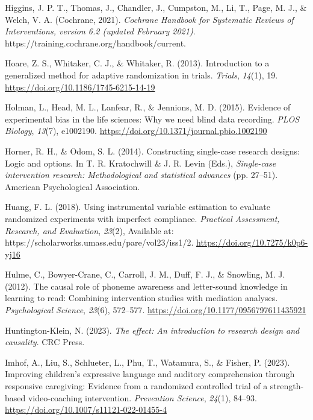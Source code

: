 \documentclass{krantz}
\newlength{\cslhangindent}
\newlength{\cslentryspacingunit} %
\newenvironment{CSLReferences}[2] %
{%
\setlength{\parindent}{0pt}
\ifodd #1
\let\oldpar\par
\def\par{\hangindent=\cslhangindent\oldpar}
\fi
\setlength{\parskip}{#2\cslentryspacingunit}
}%
{}
\begin{document}
\begin{CSLReferences}{1}{0}
\leavevmode{}%
Higgins, J. P. T., Thomas, J., Chandler, J., Cumpston, M., Li, T., Page, M. J., \& Welch, V. A. (Cochrane, 2021). \emph{Cochrane {Handbook} for {Systematic Reviews} of {Interventions}, version 6.2 (updated {February} 2021)}. https://training.cochrane.org/handbook/current.

\leavevmode{}%
Hoare, Z. S., Whitaker, C. J., \& Whitaker, R. (2013). Introduction to a generalized method for adaptive randomization in trials. \emph{Trials}, \emph{14}(1), 19. \url{https://doi.org/10.1186/1745-6215-14-19}

\leavevmode{}%
Holman, L., Head, M. L., Lanfear, R., \& Jennions, M. D. (2015). Evidence of experimental bias in the life sciences: {Why} we need blind data recording. \emph{PLOS Biology}, \emph{13}(7), e1002190. \url{https://doi.org/10.1371/journal.pbio.1002190}

\leavevmode{}%
Horner, R. H., \& Odom, S. L. (2014). Constructing single-case research designs: {Logic} and options. In T. R. Kratochwill \& J. R. Levin (Eds.), \emph{Single-case intervention research: {Methodological} and statistical advances} (pp. 27--51). {American Psychological Association}.

\leavevmode{}%
Huang, F. L. (2018). Using instrumental variable estimation to evaluate randomized experiments with imperfect compliance. \emph{Practical Assessment, Research, and Evaluation}, \emph{23}(2), Available at: https://scholarworks.umass.edu/pare/vol23/iss1/2. \url{https://doi.org/10.7275/k0p6-yj16}

\leavevmode{}%
Hulme, C., Bowyer-Crane, C., Carroll, J. M., Duff, F. J., \& Snowling, M. J. (2012). The causal role of phoneme awareness and letter-sound knowledge in learning to read: Combining intervention studies with mediation analyses. \emph{Psychological Science}, \emph{23}(6), 572--577. \url{https://doi.org/10.1177/0956797611435921}

\leavevmode{}%
Huntington-Klein, N. (2023). \emph{The effect: An introduction to research design and causality}. {CRC Press}.

\leavevmode{}%
Imhof, A., Liu, S., Schlueter, L., Phu, T., Watamura, S., \& Fisher, P. (2023). Improving children's expressive language and auditory comprehension through responsive caregiving: Evidence from a randomized controlled trial of a strength-based video-coaching intervention. \emph{Prevention Science}, \emph{24}(1), 84--93. \url{https://doi.org/10.1007/s11121-022-01455-4}


\end{CSLReferences}
\end{document}
